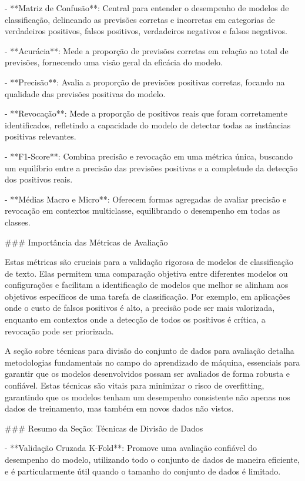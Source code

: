 {- **Matriz de Confusão**: Central para entender o desempenho de modelos de classificação, delineando as previsões corretas e incorretas em categorias de verdadeiros positivos, falsos positivos, verdadeiros negativos e falsos negativos.

- **Acurácia**: Mede a proporção de previsões corretas em relação ao total de previsões, fornecendo uma visão geral da eficácia do modelo.

- **Precisão**: Avalia a proporção de previsões positivas corretas, focando na qualidade das previsões positivas do modelo.

- **Revocação**: Mede a proporção de positivos reais que foram corretamente identificados, refletindo a capacidade do modelo de detectar todas as instâncias positivas relevantes.

- **F1-Score**: Combina precisão e revocação em uma métrica única, buscando um equilíbrio entre a precisão das previsões positivas e a completude da detecção dos positivos reais.

- **Médias Macro e Micro**: Oferecem formas agregadas de avaliar precisão e revocação em contextos multiclasse, equilibrando o desempenho em todas as classes.

### Importância das Métricas de Avaliação

Estas métricas são cruciais para a validação rigorosa de modelos de classificação de texto. Elas permitem uma comparação objetiva entre diferentes modelos ou configurações e facilitam a identificação de modelos que melhor se alinham aos objetivos específicos de uma tarefa de classificação. Por exemplo, em aplicações onde o custo de falsos positivos é alto, a precisão pode ser mais valorizada, enquanto em contextos onde a detecção de todos os positivos é crítica, a revocação pode ser priorizada.

A seção sobre técnicas para divisão do conjunto de dados para avaliação detalha metodologias fundamentais no campo do aprendizado de máquina, essenciais para garantir que os modelos desenvolvidos possam ser avaliados de forma robusta e confiável. Estas técnicas são vitais para minimizar o risco de overfitting, garantindo que os modelos tenham um desempenho consistente não apenas nos dados de treinamento, mas também em novos dados não vistos.

### Resumo da Seção: Técnicas de Divisão de Dados

- **Validação Cruzada K-Fold**: Promove uma avaliação confiável do desempenho do modelo, utilizando todo o conjunto de dados de maneira eficiente, e é particularmente útil quando o tamanho do conjunto de dados é limitado.

}
